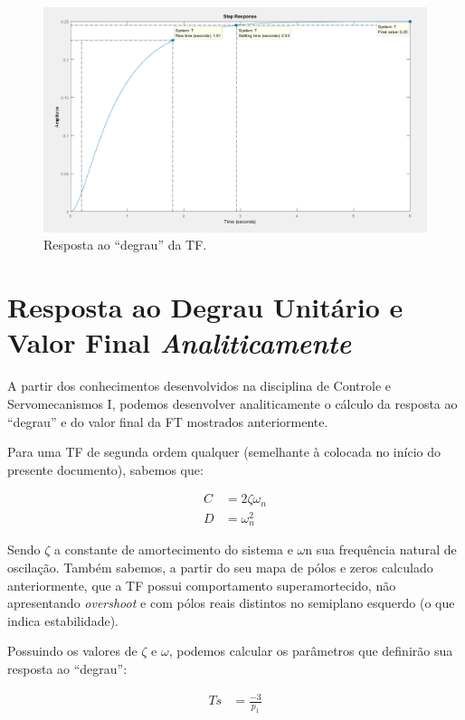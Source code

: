\documentclass[
	article,			%
	11pt,				%
	oneside,			%
	a4paper,			%
	english,			%
	brazil,				%
	sumario=tradicional
	]{abntex2}
\begin{document}
\begin{figure}
  \includegraphics[width=\linewidth, center]{step.png}
  \caption{Resposta ao ``degrau'' da TF.}
  \label{fig:step}
\end{figure}

\section{Resposta ao Degrau Unitário e Valor Final \emph{Analiticamente}}

A partir dos conhecimentos desenvolvidos na disciplina de Controle e Servomecanismos I, podemos desenvolver analiticamente
o cálculo da resposta ao ``degrau'' e do valor final da FT mostrados anteriormente.

Para uma TF de segunda ordem qualquer (semelhante à colocada no início do presente documento), sabemos que:

\begin{align*}
  C &= 2\zeta\omega_n \\
  D &= \omega_n^2
\end{align*}

Sendo ${\zeta}$ a constante de amortecimento do sistema e ${\omega}$n sua frequência natural de oscilação. Também sabemos, a partir do seu mapa de pólos e zeros calculado anteriormente, que a TF possui comportamento superamortecido, não apresentando \emph{overshoot} e com pólos reais distintos no semiplano esquerdo (o que indica estabilidade).

Possuindo os valores de ${\zeta}$ e ${\omega}$, podemos calcular os parâmetros que definirão sua resposta ao ``degrau'':

\begin{align*}
  Ts &= \frac{-3}{p_1}
\end{align*}
\end{document}
